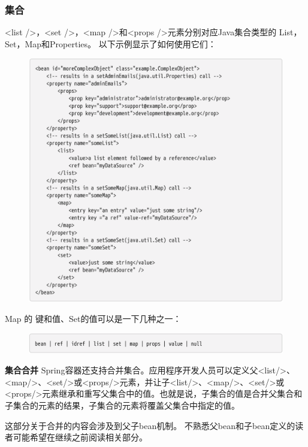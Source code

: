 \newpage
\subsubsection{集合}
<list />，<set />，<map />和<props />元素分别对应Java集合类型的
List，Set，Map和Properties。 以下示例显示了如何使用它们：

\begin{figure}[ht]
    \centering
    \includegraphics[width=1\linewidth]{./Figure/IMG_code_41.png}
\end{figure}

Map 的 键和值、Set的值可以是一下几种之一：

\begin{figure}[ht]
    \centering
    \includegraphics[width=1\linewidth]{./Figure/IMG_code_42.png}
\end{figure}

\textbf{集合合并}
Spring容器还支持合并集合。应用程序开发人员可以定义父<list/>、<map/>、<set/>或<props/>元素，并让子<list/>、<map/>、<set/>或<props/>元素继承和重写父集合中的值。也就是说，子集合的值是合并父集合和子集合的元素的结果，子集合的元素将覆盖父集合中指定的值。

这部分关于合并的内容会涉及到父子bean机制。
不熟悉父bean和子bean定义的读者可能希望在继续之前阅读相关部分。

